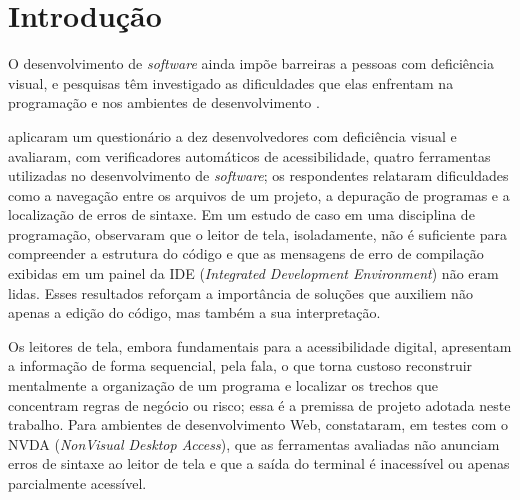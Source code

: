 \documentclass[
    12pt,                   %
    openright,              %
    oneside,                %
    a4paper,                %
    sumario=tradicional,    %
    english,                %
    brazil,                 %
    ]{abntex2}
\begin{document}



\tableofcontents*
\cleardoublepage

\textual

\chapter{Introdução}\label{sec:introducao}

O desenvolvimento de \textit{software} ainda impõe barreiras a pessoas com deficiência visual, e pesquisas têm investigado as dificuldades que elas enfrentam na programação e nos ambientes de desenvolvimento \cite{acad54431201,latinoware20457}.

\textcite{latinoware20457} aplicaram um questionário a dez desenvolvedores com deficiência visual e avaliaram, com verificadores automáticos de acessibilidade, quatro ferramentas utilizadas no desenvolvimento de \textit{software}; os respondentes relataram dificuldades como a navegação entre os arquivos de um projeto, a depuração de programas e a localização de erros de sintaxe. Em um estudo de caso em uma disciplina de programação, \textcite{acad54431201} observaram que o leitor de tela, isoladamente, não é suficiente para compreender a estrutura do código e que as mensagens de erro de compilação exibidas em um painel da IDE (\textit{Integrated Development Environment}) não eram lidas. Esses resultados reforçam a importância de soluções que auxiliem não apenas a edição do código, mas também a sua interpretação.

Os leitores de tela, embora fundamentais para a acessibilidade digital, apresentam a informação de forma sequencial, pela fala, o que torna custoso reconstruir mentalmente a organização de um programa e localizar os trechos que concentram regras de negócio ou risco; essa é a premissa de projeto adotada neste trabalho. Para ambientes de desenvolvimento Web, \textcite{latinoware6969} constataram, em testes com o NVDA (\textit{NonVisual Desktop Access}), que as ferramentas avaliadas não anunciam erros de sintaxe ao leitor de tela e que a saída do terminal é inacessível ou apenas parcialmente acessível.
\end{document}
